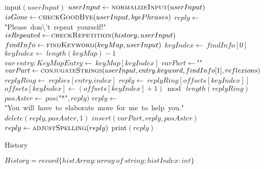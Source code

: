 \documentclass[a4paper,10pt]{article}
\begin{document}
\begin{algorithm}
\begin{algorithmic}[5]
  \Repeat
    \State \(\)input\((userInput)\)
    \State {}
    \State {}
    \State \(userInput\gets\Call{normalizeInput}{userInput}\)
    \State \(isGone\gets\Call{checkGoodBye}{userInput,byePhrases}\)
      \State \(reply\gets\)"{}Please\ don\textbackslash{}'{}t\ repeat\ yourself!"{}\(\)
      \State \(isRepeated\gets\Call{checkRepetition}{history,userInput}\)
        \State \(findInfo\gets\Call{findKeyword}{keyMap,userInput}\)
        \State \(keyIndex\gets\ findInfo[0]\)
          \State \(keyIndex\gets\ length(keyMap)-1\)
        \EndIf
        \State \(var\ entry:KeyMapEntry\gets\ keyMap[keyIndex]\)
        \State \(varPart\gets\)"{}"{}\(\)
          \State \(varPart\gets\Call{conjugateStrings}{userInput,entry.keyword,findInfo[1],reflexions}\)
        \EndIf
        \State \(replyRing\gets\ replies[entry.index]\)
        \State \(reply\gets\ replyRing[offsets[keyIndex]]\)
        \State \(offsets[keyIndex]\gets(offsets[keyIndex]+1)\bmod\ length(replyRing)\)
        \State \(posAster\gets\ pos(\)"{}*"{}\(,reply)\)
            \State \(reply\gets\)"{}You\ will\ have\ to\ elaborate\ more\ for\ me\ to\ help\ you."{}\(\)
          \Else
            \State \(delete(reply,posAster,1)\)
            \State \(insert(varPart,reply,posAster)\)
          \EndIf
        \EndIf
        \State \(reply\gets\Call{adjustSpelling}{reply}\)
      \EndIf
      \State \(\)print\((reply)\)
    \EndIf
\EndProcedure
\end{algorithmic}
\end{algorithm}


\begin{algorithm}
\caption{History}
\begin{algorithmic}[5]
\State {}
  \State {}
  \State {}
  \State {}
  \State {}
  \State {}
  \State {}
    \State \(History = record\{histArray:array\ of\ string;histIndex:int\}\)
  \EndDecl
\EndProcedure
\end{algorithmic}
\end{algorithm}
\end{document}

